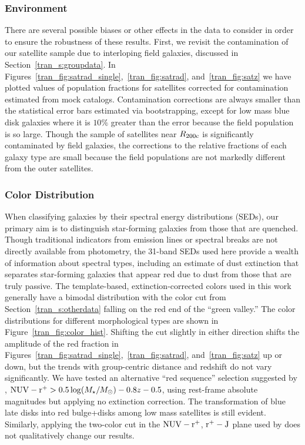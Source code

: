 \subsubsection{Environment}

There are several possible biases or other effects in the data to
consider in order to ensure the robustness of these results. First, we
revisit the contamination of our satellite sample due to interloping
field galaxies, discussed in Section~\ref{tran_s:groupdata}. In
Figures~\ref{tran_fig:satrad_single},~\ref{tran_fig:satrad}, and~\ref{tran_fig:satz} we
have plotted values of population fractions for satellites corrected for contamination estimated
from mock catalogs. Contamination corrections are always smaller
than the statistical error bars estimated via bootstrapping, except
for low mass blue disk galaxies where it is $10\%$ greater than the
error because the field population is so large. Though the sample of satellites near $R_{\rm 200c}$ is
significantly contaminated by field galaxies, the corrections to the
relative fractions of each galaxy type are small because the field
populations are not markedly different from the outer satellites.

\subsubsection{Color Distribution}

When classifying galaxies by their spectral energy distributions (SEDs), our primary aim
is to distinguish star-forming galaxies from those that are
quenched. Though traditional indicators from emission lines or
spectral breaks are not directly available from photometry, the 31-band SEDs
used here provide a wealth of information about spectral types,
including an estimate of dust extinction that separates star-forming
galaxies that appear red due to dust from those that are truly
passive. The template-based, extinction-corrected \nuvr colors used in
this work generally have a bimodal distribution with the color cut
from Section~\ref{tran_s:otherdata} falling on the red end of the ``green
valley.'' The color distributions for different morphological types
are shown in Figure~\ref{tran_fig:color_hist}. Shifting the cut slightly in
either direction shifts the amplitude of the red fraction in
Figures~\ref{tran_fig:satrad_single},~\ref{tran_fig:satrad}, and~\ref{tran_fig:satz}
up or down, but the trends with group-centric distance and redshift do
not vary significantly. We have tested an alternative ``red sequence''
selection suggested by \citet{Ilbert2010}, ${\rm NUV - r^+} >
0.5\log(M_{\star}/M_{\odot}) - 0.8 z - 0.5$, using rest-frame absolute
magnitudes but applying no extinction correction. The transformation
of blue late disks into red bulge+disks among low mass satellites is
still evident. Similarly, applying the two-color cut in the ${\rm NUV
  - r^+}$, ${\rm r^+ - J}$ plane used by \citet{Bundy2010} does not
qualitatively change our results.

